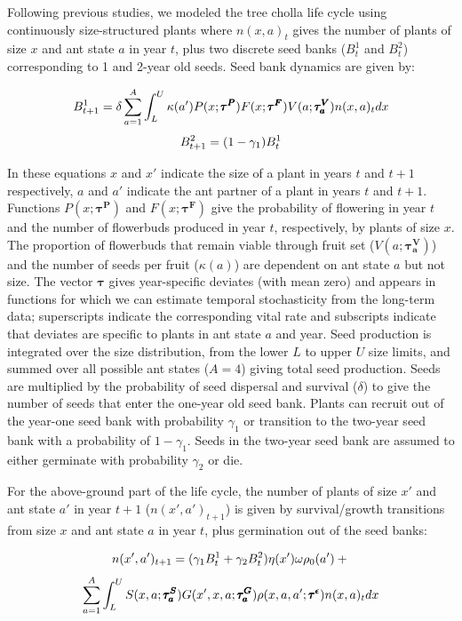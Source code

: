 \documentclass[11pt]{article}
\begin{document}
Following previous studies, we modeled the tree cholla life cycle using continuously size-structured plants where $n(x,a)_{t}$ gives the number of plants of size $x$  and ant state $a$ in year $t$, plus two discrete seed banks ($B^1_{t}$ and $B^2_{t}$) corresponding to 1 and 2-year old seeds. 
Seed bank dynamics are given by:

\begin{linenomath*}
	$$
	B^1_{t+1} = \delta \sum_{a=1}^{A} \int_L^U  \kappa(a') P(x;\pmb{\tau^P}) F(x;\pmb{\tau^F}) V(a;\pmb{\tau^V_{a}}) n(x,a)_{t} dx \\
	$$
	$$
	B^2_{t+1} =  (1 - \gamma_1)B^1_{t}\\
	$$
\end{linenomath*}

\noindent In these equations $x$ and $x'$ indicate the size of a plant in years $t$ and $t+1$ respectively, $a$ and $a'$ indicate the ant partner of a plant in years $t$ and $t+1$.
Functions $P(x;\pmb{\tau^P})$ and $F(x;\pmb{\tau^F})$ give the probability of flowering in year $t$ and the number of flowerbuds produced in year $t$, respectively, by plants of size $x$. 
The proportion of flowerbuds that remain viable through fruit set ($V(a;\pmb{\tau^V_{a}})$) and the number of seeds per fruit ($\kappa(a)$) are dependent on ant state $a$ but not size. 
The vector $\pmb{\tau}$ gives year-specific deviates (with mean zero) and appears in functions for which we can estimate temporal stochasticity from the long-term data; superscripts indicate the corresponding vital rate and subscripts indicate that deviates are specific to plants in ant state $a$ and year.
Seed production is integrated over the size distribution, from the lower $L$ to upper $U$ size limits, and summed over all possible ant states ($A=4$) giving total seed production. 
Seeds are multiplied by the probability of seed dispersal and survival ($\delta$) to give the number of seeds that enter the one-year old seed bank. 
Plants can recruit out of the year-one seed bank with probability $\gamma_1$ or transition to the two-year seed bank with a probability of $1 - \gamma_1$. 
Seeds in the two-year seed bank are assumed to either germinate with probability $\gamma_2$ or die. 

For the above-ground part of the life cycle, the number of plants of size $x'$ and ant state $a'$ in year $t+1$ ($n(x',a')_{t+1}$) is given by survival/growth transitions from size $x$ and ant state $a$ in year $t$, plus germination out of the seed banks:
\begin{linenomath*}
	$$
	n(x',a')_{t+1} = (\gamma_1 B^1_{t} + \gamma_2 B^2_{t} ) \eta(x') \omega \rho_{0}(a')  + \\
	$$
	$$
	\sum_{a=1}^{A} \int_L^U S(x,a;\pmb{\tau^S_{a}}) G(x',x,a;\pmb{\tau^G_{a}}) \rho(x,a,a';\pmb{\tau^{\epsilon}}) n(x,a)_t dx \\
	$$
\end{linenomath*}
\end{document}
